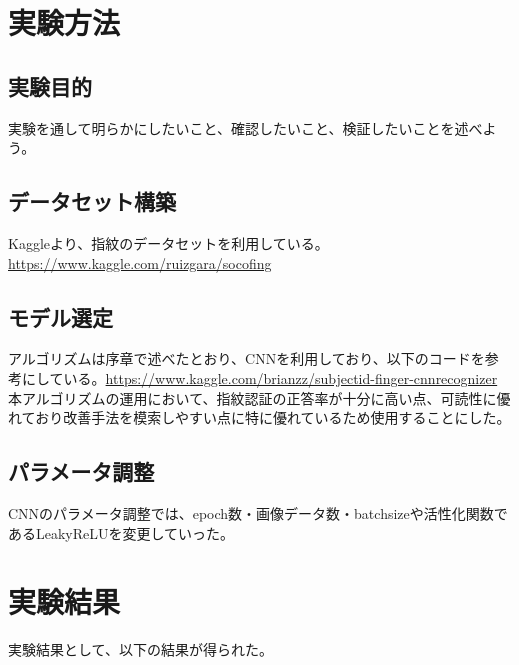\documentclass[a4paper, 11pt, titlepage]{jsarticle}
\begin{document}
\section{実験方法}


\subsection{実験目的}
実験を通して明らかにしたいこと、確認したいこと、検証したいことを述べよう。


\subsection{データセット構築}
Kaggleより、指紋のデータセットを利用している。\url{https://www.kaggle.com/ruizgara/socofing}

\subsection{モデル選定}
アルゴリズムは序章で述べたとおり、CNNを利用しており、以下のコードを参考にしている。\url{https://www.kaggle.com/brianzz/subjectid-finger-cnnrecognizer}\\
本アルゴリズムの運用において、指紋認証の正答率が十分に高い点、可読性に優れており改善手法を模索しやすい点に特に優れているため使用することにした。

\subsection{パラメータ調整}
CNNのパラメータ調整では、epoch数・画像データ数・batchsizeや活性化関数であるLeakyReLUを変更していった。


\section{実験結果}

実験結果として、以下の結果が得られた。%
\end{document}
